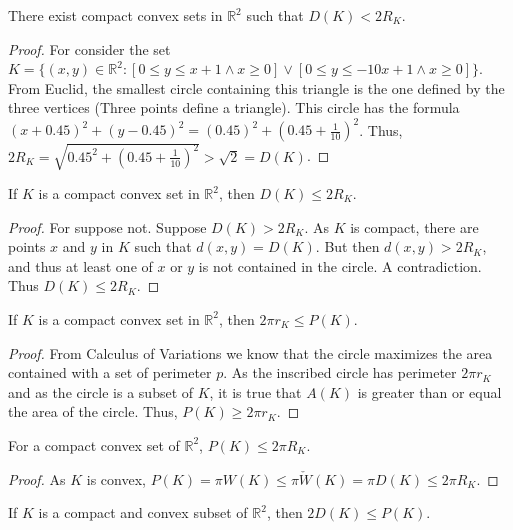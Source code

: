 \documentclass[crop=false,class=book,oneside]{standalone}
\begin{document}
            \begin{theorem}
            There exist compact convex sets in $\mathbb{R}^2$ such that $D(K) < 2R_K$.
            \end{theorem}
            \begin{proof}
            For consider the set $K=\{(x,y)\in \mathbb{R}^2: [0\leq y\leq x+1 \land x\geq 0]\lor [0\leq y\leq -10x+1\land x\geq 0]\}$. From Euclid, the smallest circle containing this triangle is the one defined by the three vertices (Three points define a triangle). This circle has the formula $(x+0.45)^2+(y-0.45)^2 = (0.45)^2 +(0.45+\frac{1}{10})^2$. Thus, $2R_K = \sqrt{0.45^2 +(0.45+\frac{1}{10})^2} > \sqrt{2} = D(K)$.
            \end{proof}
            \begin{theorem}
            If $K$ is a compact convex set in $\mathbb{R}^2$, then $D(K) \leq 2R_K$.
            \end{theorem}
            \begin{proof}
            For suppose not. Suppose $D(K) > 2R_K$. As $K$ is compact, there are points $x$ and $y$ in $K$ such that $d(x,y)=D(K)$. But then $d(x,y)>2R_K$, and thus at least one of $x$ or $y$ is not contained in the circle. A contradiction. Thus $D(K)\leq 2R_K$.
            \end{proof}
            \begin{theorem}
            If $K$ is a compact convex set in $\mathbb{R}^2$, then $2\pi r_K \leq P(K)$.
            \end{theorem}
            \begin{proof}
            From Calculus of Variations we know that the circle maximizes the area contained with a set of perimeter $p$. As the inscribed circle has perimeter $2\pi r_K$ and as the circle is a subset of $K$, it is true that $A(K)$ is greater than or equal the area of the circle. Thus, $P(K)\geq 2\pi r_K$.
            \end{proof}
            \begin{theorem}
            For a compact convex set of $\mathbb{R}^2$, $P(K) \leq 2\pi R_K$.
            \end{theorem}
            \begin{proof}
            As $K$ is convex, $P(K) = \pi W(K) \leq \pi \check{W}(K) = \pi D(K) \leq 2\pi R_K$.
            \end{proof}
            \begin{theorem}
            If $K$ is a compact and convex subset of $\mathbb{R}^2$, then $2D(K)\leq P(K)$.
            \end{theorem}
\end{document}
